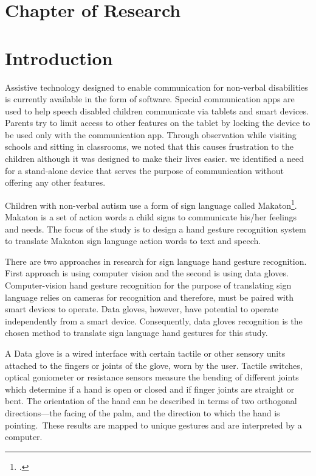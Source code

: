 \section{Chapter of Research} 

\section{Introduction}

Assistive technology designed to enable communication for non-verbal disabilities is currently available in the form of software. Special communication apps are used to help speech disabled children communicate via tablets and smart devices. Parents try to limit access to other features on the tablet by locking the device to be used only with the communication app. Through observation while visiting schools and sitting in classrooms, we noted that this causes frustration to the children although it was designed to make their lives easier. we identified a need for a stand-alone device that serves the purpose of communication without offering any other features.

Children with non-verbal autism use a form of sign language called Makaton\footcite{Makaton}. Makaton is a set of action words a child signs to communicate his/her feelings and needs. The focus of the study is to design a hand gesture recognition system to translate Makaton sign language action words to text and speech. 

There are two approaches in research for sign language hand gesture recognition. First approach is using computer vision and the second is using data gloves. Computer-vision hand gesture recognition for the purpose of translating sign language relies on cameras for recognition and therefore, must be paired with smart devices to operate. Data gloves, however, have potential to operate independently from a smart device. Consequently, data gloves recognition is the chosen method to translate sign language hand gestures for this study. 

A Data glove is a wired interface with certain tactile or other sensory units attached to the fingers or joints of the glove, worn by the user. Tactile switches, optical goniometer or resistance sensors measure the bending of different joints which determine if a hand is open or closed and if finger joints are straight or bent. The orientation of the hand can be described in terms of two orthogonal directions—the facing of the palm, and the direction to which the hand is pointing. These results are mapped to unique gestures and are interpreted by a computer. 

